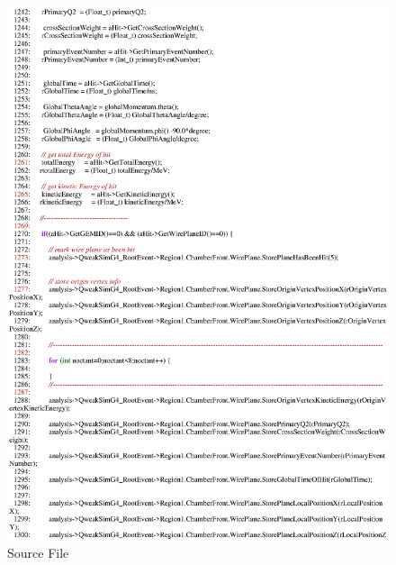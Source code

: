 \begin{figure}[h]
  \hspace{0cm}
  \includegraphics[scale=0.8]{./figures13/QweakSimEventAction.cc-p22.eps}
  \caption{Source File}
           \label{fig:XIII-SC-37}
\end{figure}

\clearpage

